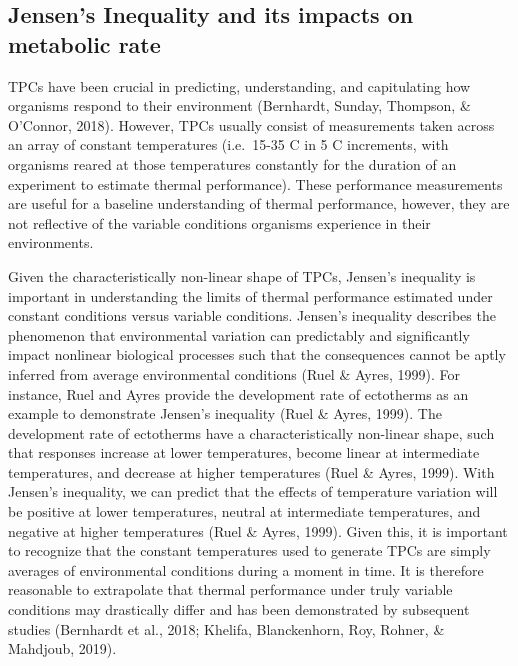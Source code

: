 \documentclass[12pt,twoside]{reedthesis}
\begin{document}
\hypertarget{jensens-inequality-and-its-impacts-on-metabolic-rate}{%
\subsection{Jensen's Inequality and its impacts on metabolic rate}\label{jensens-inequality-and-its-impacts-on-metabolic-rate}}

TPCs have been crucial in predicting, understanding, and capitulating how organisms respond to their environment (Bernhardt, Sunday, Thompson, \& O'Connor, 2018). However, TPCs usually consist of measurements taken across an array of constant temperatures (i.e.~15-35 C in 5 C increments, with organisms reared at those temperatures constantly for the duration of an experiment to estimate thermal performance). These performance measurements are useful for a baseline understanding of thermal performance, however, they are not reflective of the variable conditions organisms experience in their environments.

Given the characteristically non-linear shape of TPCs, Jensen's inequality is important in understanding the limits of thermal performance estimated under constant conditions versus variable conditions. Jensen's inequality describes the phenomenon that environmental variation can predictably and significantly impact nonlinear biological processes such that the consequences cannot be aptly inferred from average environmental conditions (Ruel \& Ayres, 1999). For instance, Ruel and Ayres provide the development rate of ectotherms as an example to demonstrate Jensen's inequality (Ruel \& Ayres, 1999). The development rate of ectotherms have a characteristically non-linear shape, such that responses increase at lower temperatures, become linear at intermediate temperatures, and decrease at higher temperatures (Ruel \& Ayres, 1999). With Jensen's inequality, we can predict that the effects of temperature variation will be positive at lower temperatures, neutral at intermediate temperatures, and negative at higher temperatures (Ruel \& Ayres, 1999). Given this, it is important to recognize that the constant temperatures used to generate TPCs are simply averages of environmental conditions during a moment in time. It is therefore reasonable to extrapolate that thermal performance under truly variable conditions may drastically differ and has been demonstrated by subsequent studies (Bernhardt et al., 2018; Khelifa, Blanckenhorn, Roy, Rohner, \& Mahdjoub, 2019).
\end{document}
